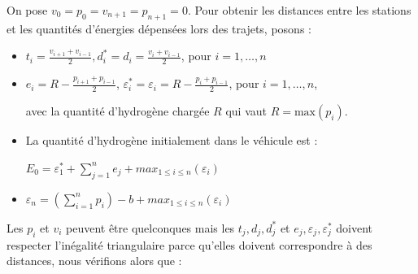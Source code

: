 
On pose $v_{0}=p_{0}=v_{n+1}=p_{n+1}=0$. Pour obtenir les distances entre les stations et les quantités d'énergies dépensées lors des trajets, posons :
\begin{itemize}

\item  $t_i=\frac{v_{i+1}+v_{i-1}}{2}, d_{i}^*=d_{i}=\frac{v_{i}+v_{i-1}}{2} $, pour  $i=1,\dots, n$

\item $e_i=R- \frac{p_{i+1}+p_{i-1}}{2}$, $\varepsilon_{i}^*=\varepsilon_{i}=R-\frac{p_{i}+p_{i-1}}{2}  $, pour  $i =1, \dots,  n$,

avec la quantité d'hydrogène chargée $R$ qui vaut $R = \textrm{max}(p_i) $.%

\item La quantité d'hydrogène initialement dans le véhicule est :

$E_0 = \varepsilon_{1}^*+ \sum_{j=1}^{n}e_j+ max_{1 \leq i \leq n}(\varepsilon_{i})$

\item $\varepsilon_{n} =(\sum_{i=1}^{n}p_i)-b+ max_{1 \leq i \leq n}(\varepsilon_{i})$

\end{itemize}


Les $p_i$ et $v_i$ peuvent être quelconques mais les $t_j, d_j, d_j^*$ et $e_j, \varepsilon_{j}, \varepsilon_{j}^*$  doivent respecter l'inégalité triangulaire parce qu'elles doivent correspondre à des distances, nous vérifions alors que :



